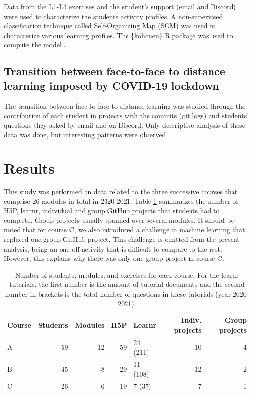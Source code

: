 \documentclass{aims}
\theoremstyle{definition}
\begin{document}
Data from the L1-L4 exercises and the student's support (email and
Discord) were used to characterize the students activity profiles. A
non-supervised classification technique called Self-Organizing Map (SOM)
\cite{Kohonen1995} was used to characterize various learning profiles.
The \{kohonen\} R package was used to compute the model
\cite{Wehrens2018}.

\hypertarget{transition-between-face-to-face-to-distance-learning-imposed-by-covid-19-lockdown}{%
\subsection{Transition between face-to-face to distance learning imposed
by COVID-19
lockdown}\label{transition-between-face-to-face-to-distance-learning-imposed-by-covid-19-lockdown}}

The transition between face-to-face to distance learning was studied
through the contribution of each student in projects with the commits
(git logs) and students' questions they asked by email and on Discord.
Only descriptive analysis of these data was done, but interesting
patterns were observed.

\hypertarget{results}{%
\section{Results}\label{results}}

This study was performed on data related to the three successive courses
that comprise 26 modules in total in 2020-2021. Table
\ref {tab:tab_course} summarizes the number of H5P, learnr, individual
and group GitHub projects that students had to complete. Group projects
usually spanned over several modules. It should be noted that for course
C, we also introduced a challenge in machine learning that replaced one
group GitHub project. This challenge is omitted from the present
analysis, being an one-off activity that is difficult to compare to the
rest. However, this explains why there was only one group project in
course C.

\begin{table}

\caption{\label{tab:tab_course_summary}\label{tab:tab_course} Number of students, modules, and exercises for each course. For the learnr tutorials, the first number is the amount of tutorial documents and the second number in brackets is the total number of questions in these tutorials (year 2020-2021).}
\centering
\begin{tabular}[t]{l|r|r|r|l|r|r}
\hline
Course & Students & Modules & H5P & Learnr & Indiv. projects & Group projects\\
\hline
A & 59 & 12 & 59 & 24 (211) & 10 & 4\\
\hline
B & 45 & 8 & 29 & 11 (108) & 12 & 2\\
\hline
C & 26 & 6 & 19 & 7 (37) & 7 & 1\\
\hline
\end{tabular}
\end{table}
\end{document}
